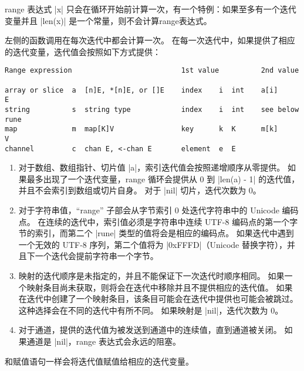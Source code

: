 range 表达式 \code|x| 只会在循环开始前计算一次，有一个特例：如果至多有一个迭代变量并且 \code|len(x)| 是一个常量，则不会计算range表达式。

左侧的函数调用在每次迭代中都会计算一次。
在每一次迭代中，如果提供了相应的迭代变量，迭代值会按照如下方式提供：
\begin{lstlisting}
Range expression                          1st value          2nd value

array or slice  a  [n]E, *[n]E, or []E    index    i  int    a[i]       E
string          s  string type            index    i  int    see below  rune
map             m  map[K]V                key      k  K      m[k]       V
channel         c  chan E, <-chan E       element  e  E
\end{lstlisting}

\begin{enumerate}
\item 对于数组、数组指针、切片值 \code|a|，索引迭代值会按照递增顺序从零提供。
如果最多出现了一个迭代变量，range 循环会提供从 0 到 \code|len(a) - 1| 的迭代值，并且不会索引到数组或切片自身。
对于 \code|nil| 切片，迭代次数为 0。
\item 对于字符串值，``range'' 子部会从字节索引 0 处迭代字符串中的 Unicode 编码点。
在连续的迭代中，索引值必须是字符串中连续 UTF-8 编码点的第一个字节的索引，而第二个 \code|rune| 类型的值将会是相应的编码点。
如果迭代中遇到一个无效的 UTF-8 序列，第二个值将为 \code|0xFFFD|（Unicode 替换字符），并且下一个迭代会提前字符串一个字节。
\item 映射的迭代顺序是未指定的，并且不能保证下一次迭代时顺序相同。
如果一个映射条目尚未获取，则将会在迭代中移除并且不提供相应的迭代值。
如果在迭代中创建了一个映射条目，该条目可能会在迭代中提供也可能会被跳过。
这种选择会在不同的迭代中有所不同。
如果映射是 \code|nil|，迭代次数为 0。
\item 对于通道，提供的迭代值为被发送到通道中的连续值，直到通道被关闭。
如果通道是 \code|nil|，range 表达式会永远的阻塞。
\end{enumerate}

和赋值语句一样会将迭代值赋值给相应的迭代变量。

